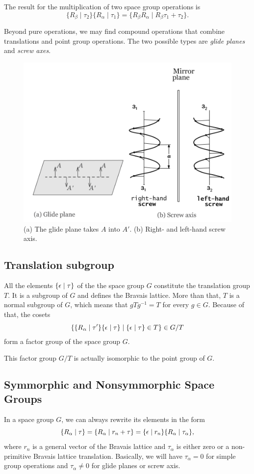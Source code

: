 \documentclass[a4paper,12pt]{report}
\newcommand{\sg}[2]{\{ #1 \mid #2 \}}
\begin{document}
The result for the multiplication of two space group operations is
$$
\sg{R_\beta}{\tau_2} \sg{R_\alpha}{\tau_1} = \sg{R_\beta R_\alpha}{R_\beta\tau_1 + \tau_2}.
$$

Beyond pure operations, we may find compound operations that combine translations and point group operations. The two possible types are \textit{glide planes} and \textit{screw axes}.
\begin{figure}[H]
\centering
\includegraphics[width=0.5\linewidth]{fig/glideplane-screwaxis.png}
\caption{(a) The glide plane takes $A$ into $A'$. (b) Right- and left-hand screw axis.}
\label{fig:glideplane-screwaxis}
\end{figure}

\subsection{Translation subgroup}

All the elements $\sg{\eps}{\tau}$ of the the space group $G$ constitute the translation group $T$. It is a subgroup of $G$ and defines the Bravais lattice. More than that, $T$ is a normal subgroup of $G$, which means that $g T g^{-1} = T$ for every $g \in G$. Because of that, the cosets
$$
\{ \sg{R_\alpha}{\tau'} \sg{\eps}{\tau} \mid \sg{\eps}{\tau} \in T \} \in G/T
$$
form a factor group of the space group $G$.

This factor group $G/T$ is actually isomorphic to the point group of $G$.

\subsection{Symmorphic and Nonsymmorphic Space Groups}

In a space group $G$, we can always rewrite its elements in the form
$$
\sg{R_\alpha}{\tau} = \sg{R_\alpha}{r_n + \tau} = \sg{\eps}{r_n} \sg{R_\alpha}{\tau_\alpha},
$$
where $r_n$ is a general vector of the Bravais lattice and $\tau_\alpha$ is either zero or a non-primitive Bravais lattice translation. Basically, we will have $\tau_\alpha = 0$ for simple group operations and $\tau_\alpha \neq 0$ for glide planes or screw axis.
\end{document}
